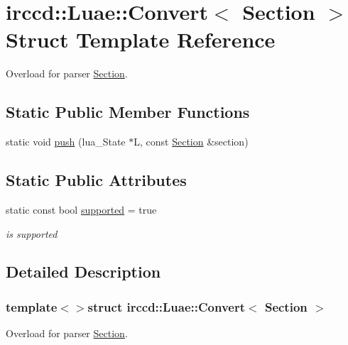 \hypertarget{a00013}{\section{irccd\-:\-:Luae\-:\-:Convert$<$ Section $>$ Struct Template Reference}
\label{a00013}
}


Overload for parser \hyperlink{a00054}{Section}.  


\subsection*{Static Public Member Functions}
\begin{DoxyCompactItemize}
\item 
static void \hyperlink{a00013_a7a66f9a610b2556758560e2f1d6e8299}{push} (lua\-\_\-\-State $\ast$L, const \hyperlink{a00054}{Section} \&section)
\end{DoxyCompactItemize}
\subsection*{Static Public Attributes}
\begin{DoxyCompactItemize}
\item 
\hypertarget{a00013_a963f13f27b0283d470ab2ebabbe71621}{static const bool \hyperlink{a00013_a963f13f27b0283d470ab2ebabbe71621}{supported} = true}\label{a00013_a963f13f27b0283d470ab2ebabbe71621}

\begin{DoxyCompactList}\small\item\em is supported \end{DoxyCompactList}\end{DoxyCompactItemize}


\subsection{Detailed Description}
\subsubsection*{template$<$$>$struct irccd\-::\-Luae\-::\-Convert$<$ Section $>$}

Overload for parser \hyperlink{a00054}{Section}. 

